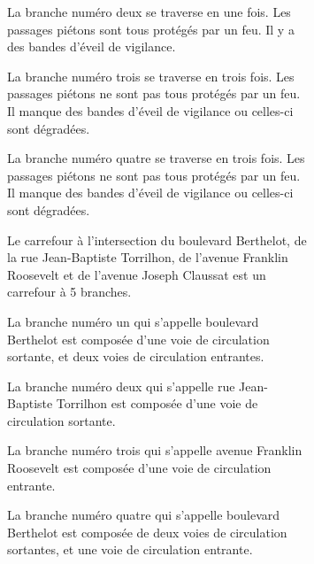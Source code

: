 \begin{figure}[H]
\begin{subfigure}[t]{\linewidth}
\begin{minipage}[t]{0.49\linewidth}
            \vspace{5pt}

            La branche numéro deux se traverse en une fois. Les passages piétons sont tous protégés par un feu. Il y a des bandes d'éveil de vigilance.
            
            \vspace{5pt}

            La branche numéro trois se traverse en trois fois. Les passages piétons ne sont pas tous protégés par un feu. Il manque des bandes d'éveil de vigilance ou celles-ci sont dégradées.

            \vspace{5pt}

            La branche numéro quatre se traverse en trois fois. Les passages piétons ne sont pas tous protégés par un feu. Il manque des bandes d'éveil de vigilance ou celles-ci sont dégradées.
        \end{minipage}
        \begin{minipage}[t]{0.49\linewidth}
            \vspace{0pt}
            \scriptsize
            Le carrefour à l'intersection du boulevard Berthelot, de la rue Jean-Baptiste Torrilhon, de l'avenue Franklin Roosevelt et de l'avenue Joseph Claussat est un carrefour à 5 branches.

            \vspace{5pt}

            La branche numéro un qui s'appelle boulevard Berthelot est composée d'une voie de circulation sortante, et deux voies de circulation entrantes.

            \vspace{5pt}

            La branche numéro deux qui s'appelle rue Jean-Baptiste Torrilhon est composée d'une voie de circulation sortante.

            \vspace{5pt}

            La branche numéro trois qui s'appelle avenue Franklin Roosevelt est composée d'une voie de circulation entrante.

            \vspace{5pt}

            La branche numéro quatre qui s'appelle boulevard Berthelot est composée de deux voies de circulation sortantes, et une voie de circulation entrante.

            \vspace{5pt}


\end{minipage}
\end{subfigure}
\end{figure}
